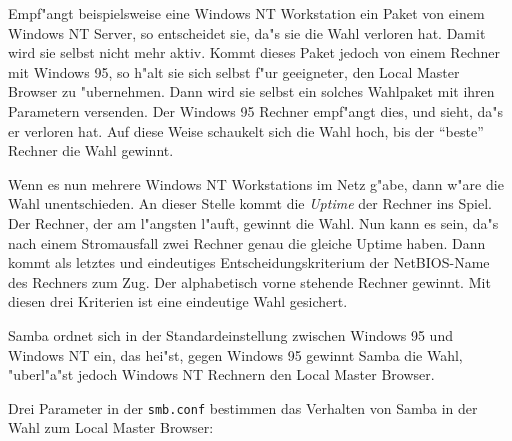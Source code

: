 \documentclass{scrartcl}\usepackage{pslatex}\typearea{12}
\newcommand{\dateistyle}{\texttt}
\begin{document}
Empf"angt beispielsweise eine Windows NT Workstation ein Paket von
einem Windows NT Server, so entscheidet sie, da"s sie die Wahl
verloren hat. Damit wird sie selbst nicht mehr aktiv. Kommt dieses
Paket jedoch von einem Rechner mit Windows 95, so h"alt sie sich
selbst f"ur geeigneter, den Local Master Browser zu "ubernehmen.
Dann wird sie selbst ein solches Wahlpaket mit ihren Parametern
versenden.  Der Windows 95 Rechner empf"angt dies, und sieht, da"s er
verloren hat.  Auf diese Weise schaukelt sich die Wahl hoch, bis der
"`beste"' Rechner die Wahl gewinnt.

Wenn es nun mehrere Windows NT Workstations im Netz g"abe, dann
w"are die Wahl unentschieden. An dieser Stelle kommt die \emph{Uptime}
der Rechner ins Spiel. Der Rechner, der am l"angsten l"auft, gewinnt
die Wahl. Nun kann es sein, da"s nach einem Stromausfall zwei Rechner
genau die gleiche Uptime haben. Dann kommt als letztes und eindeutiges
Entscheidungskriterium der NetBIOS-Name des Rechners zum Zug. Der
alphabetisch vorne stehende Rechner gewinnt. Mit diesen drei Kriterien
ist eine eindeutige Wahl gesichert.

Samba ordnet sich in der Standardeinstellung zwischen Windows 95 und
Windows NT ein, das hei"st, gegen Windows 95 gewinnt Samba die Wahl,
"uberl"a"st jedoch Windows NT Rechnern den Local Master Browser.

Drei Parameter in der \dateistyle{smb.conf} bestimmen das Verhalten von Samba
in der Wahl zum Local Master Browser:
\end{document}
